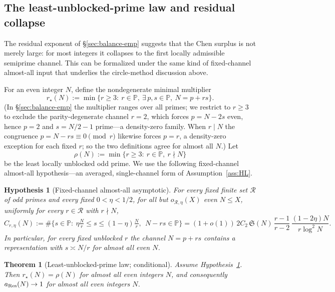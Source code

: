 \documentclass[]{interact}%
\newtheorem{theorem}{Theorem}
\newtheorem{hypothesis}{Hypothesis}
\newcommand{\PP}{\mathbb P}
\newcommand{\sing}{\mathfrak S}
\begin{document}
\subsection{The least-unblocked-prime law and residual collapse}
\label{sec:least-unblocked}

The residual exponent of \S\ref{sec:balance-emp} suggests that the Chen surplus is not merely
large: for most integers it collapses to the first locally admissible semiprime channel. This
can be formalized under the same kind of fixed-channel almost-all input that underlies the
circle-method discussion above.

For an even integer $N$, define the nondegenerate minimal multiplier
\[
  r_\star(N):=\min\{r\ge3:\ r\in\PP,\ \exists\,p,s\in\PP,\ N=p+rs\} .
\]
(In \S\ref{sec:balance-emp} the multiplier ranges over all primes; we restrict to $r\ge3$ to
exclude the parity-degenerate channel $r=2$, which forces $p=N-2s$ even, hence $p=2$ and
$s=N/2-1$ prime---a density-zero family. When $r\mid N$ the congruence $p=N-rs\equiv0\pmod r$
likewise forces $p=r$, a density-zero exception for each fixed $r$; so the two definitions
agree for almost all $N$.) Let
\[
  \rho(N):=\min\{r\ge3:\ r\in\PP,\ r\nmid N\}
\]
be the least locally unblocked odd prime. We use the following fixed-channel almost-all
hypothesis---an averaged, single-channel form of Assumption~\ref{ass:HL}.

\begin{hypothesis}[Fixed-channel almost-all asymptotic]\label{hyp:fixedchannel}
For every fixed finite set $\mathcal R$ of odd primes and every fixed $0<\eta<1/2$, for all
but $o_{\mathcal R,\eta}(X)$ even $N\le X$, uniformly for every $r\in\mathcal R$ with
$r\nmid N$,
\[
  C_{r,\eta}(N):=\#\Big\{s\in\PP:\ \eta\tfrac Nr\le s\le(1-\eta)\tfrac Nr,\ \ N-rs\in\PP\Big\}
  =(1+o(1))\,2C_2\,\sing(N)\,\frac{r-1}{r-2}\,\frac{(1-2\eta)N}{r\log^2N}.
\]
In particular, for every fixed unblocked $r$ the channel $N=p+rs$ contains a representation
with $s\asymp N/r$ for almost all even $N$.
\end{hypothesis}

\begin{theorem}[Least-unblocked-prime law; conditional]\label{thm:leastunblocked}
Assume Hypothesis~\ref{hyp:fixedchannel}. Then $r_\star(N)=\rho(N)$ for almost all even
integers $N$, and consequently $a_{\rm Res}(N)\to1$ for almost all even integers $N$.
\end{theorem}
\end{document}
